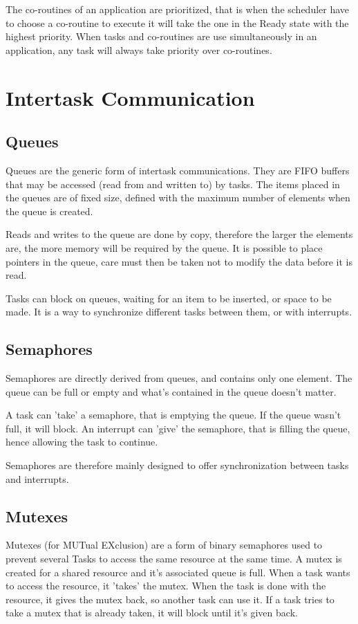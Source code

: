 \documentclass[11pt]{report}
\begin{document}
The co-routines of an application are prioritized, that is when the scheduler have to choose a co-routine to execute it will take the one in the Ready state with the highest priority. When tasks and co-routines are use simultaneously in an application, any task will always take priority over co-routines.

\section{Intertask Communication}
\subsection{Queues}

Queues are the generic form of intertask communications. They are FIFO buffers that may be accessed (read from and written to) by tasks. The items placed in the queues are of fixed size, defined with the maximum number of elements when the queue is created.

Reads and writes to the queue are done by copy, therefore the larger the elements are, the more memory will be required by the queue. It is possible to place pointers in the queue, care must then be taken not to modify the data before it is read.

Tasks can block on queues, waiting for an item to be inserted, or space to be made. It is a way to synchronize different tasks between them, or with interrupts.

\subsection{Semaphores}
Semaphores are directly derived from queues, and contains only one element. The queue can be full or empty and what's contained in the queue doesn't matter.

A task can 'take' a semaphore, that is emptying the queue. If the queue wasn't full, it will block. An interrupt can 'give' the semaphore, that is filling the queue, hence allowing the task to continue.

Semaphores are therefore mainly designed to offer synchronization between tasks and interrupts.

\subsection{Mutexes}

Mutexes (for MUTual EXclusion) are a form of binary semaphores used to prevent several Tasks to access the same resource at the same time. A mutex is created for a shared resource and it's associated queue is full. When a task wants to access the resource, it 'takes' the mutex. When the task is done with the resource, it gives the mutex back, so another task can use it. If a task tries to take a mutex that is already taken, it will block until it's given back.
\end{document}
